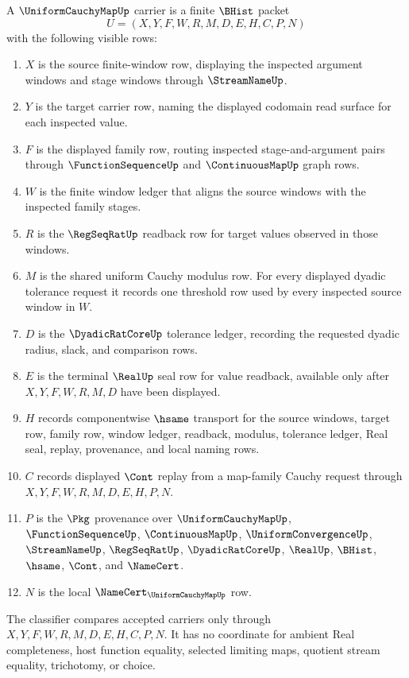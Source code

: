 \begin{definition}
\label{def:uniform-cauchy-map-carrier}
A $\UniformCauchyMapUp$ carrier is a finite $\BHist$ packet
$$
U=(X,Y,F,W,R,M,D,E,H,C,P,N)
$$
with the following visible rows:
\begin{enumerate}
\item $X$ is the source finite-window row, displaying the inspected argument windows and stage windows through $\StreamNameUp$.
\item $Y$ is the target carrier row, naming the displayed codomain read surface for each inspected value.
\item $F$ is the displayed family row, routing inspected stage-and-argument pairs through $\FunctionSequenceUp$ and $\ContinuousMapUp$ graph rows.
\item $W$ is the finite window ledger that aligns the source windows with the inspected family stages.
\item $R$ is the $\RegSeqRatUp$ readback row for target values observed in those windows.
\item $M$ is the shared uniform Cauchy modulus row. For every displayed dyadic tolerance request it records one threshold row used by every inspected source window in $W$.
\item $D$ is the $\DyadicRatCoreUp$ tolerance ledger, recording the requested dyadic radius, slack, and comparison rows.
\item $E$ is the terminal $\RealUp$ seal row for value readback, available only after $X,Y,F,W,R,M,D$ have been displayed.
\item $H$ records componentwise $\hsame$ transport for the source windows, target row, family row, window ledger, readback, modulus, tolerance ledger, Real seal, replay, provenance, and local naming rows.
\item $C$ records displayed $\Cont$ replay from a map-family Cauchy request through $X,Y,F,W,R,M,D,E,H,P,N$.
\item $P$ is the $\Pkg$ provenance over $\UniformCauchyMapUp$, $\FunctionSequenceUp$, $\ContinuousMapUp$, $\UniformConvergenceUp$, $\StreamNameUp$, $\RegSeqRatUp$, $\DyadicRatCoreUp$, $\RealUp$, $\BHist$, $\hsame$, $\Cont$, and $\NameCert$.
\item $N$ is the local $\NameCert_{\UniformCauchyMapUp}$ row.
\end{enumerate}
The classifier compares accepted carriers only through $X,Y,F,W,R,M,D,E,H,C,P,N$. It has no coordinate for ambient Real completeness, host function equality, selected limiting maps, quotient stream equality, trichotomy, or choice.
\end{definition}

